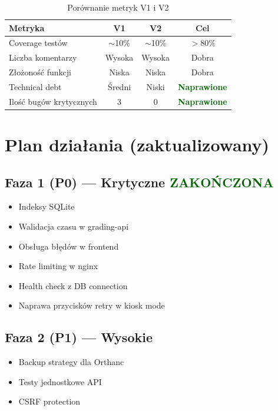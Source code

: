 \documentclass[a4paper,12pt]{article}
\newcommand{\statusok}{\textcolor{darkgreen}{\textbf{Naprawione}}}
\begin{document}
\begin{table}[h!]
\centering
\caption{Porównanie metryk V1 i V2}
\label{tab:metryki}
\begin{tabular}{lccc}
\toprule
\textbf{Metryka} & \textbf{V1} & \textbf{V2} & \textbf{Cel} \\
\midrule
Coverage testów & $\sim$10\% & $\sim$10\% & $>$80\% \\
Liczba komentarzy & Wysoka & Wysoka & Dobra \\
Złożoność funkcji & Niska & Niska & Dobra \\
Technical debt & Średni & Niski & \statusok \\
Ilość bugów krytycznych & 3 & 0 & \statusok \\
\bottomrule
\end{tabular}
\end{table}

\section{Plan działania (zaktualizowany)}

\subsection{Faza 1 (P0) — Krytyczne \textcolor{darkgreen}{ZAKOŃCZONA}}

\begin{itemize}
    \item[\checkmark] Indeksy SQLite
    \item[\checkmark] Walidacja czasu w grading-api
    \item[\checkmark] Obsługa błędów w frontend
    \item[\checkmark] Rate limiting w nginx
    \item[\checkmark] Health check z DB connection
    \item[\checkmark] Naprawa przycisków retry w kiosk mode
\end{itemize}

\subsection{Faza 2 (P1) — Wysokie}

\begin{itemize}
    \item[$\square$] Backup strategy dla Orthanc
    \item[$\square$] Testy jednostkowe API
    \item[$\square$] CSRF protection
\end{itemize}
\end{document}
